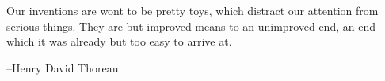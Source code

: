 \documentclass{exam}
\begin{document}
\vspace{2.5 in}



{\em 

Our inventions are wont to be pretty toys, which distract our attention from serious things. They are but improved
means to an unimproved end, an end which it was already but too easy to arrive at.  

} 

\vspace{.2 cm}

\hspace{1 cm} --Henry David Thoreau
\fi
\end{document}
